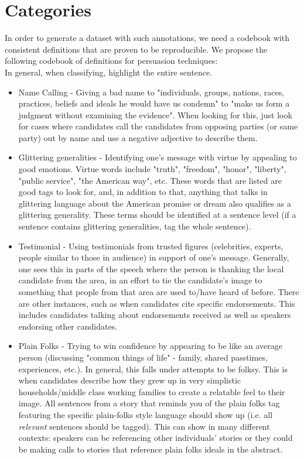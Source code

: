 \documentclass[letterpaper]{article}
\begin{document}
\section*{Categories}
In order to generate a dataset with such annotations, we need a codebook with consistent definitions that are proven to be reproducible. We propose the following codebook of definitions for persuasion techniques: \\
In general, when classifying, highlight the entire sentence.
\begin{itemize}
	\item Name Calling - Giving a bad name to "individuals, groups, nations, races, practices, beliefs and ideals he would have us condemn" to "make us form a judgment without examining the evidence". When looking for this, just look for cases where candidates call the candidates from opposing parties (or same party) out by name and use a negative adjective to describe them.  
	\item Glittering generalities - Identifying one's message with virtue by appealing to good emotions. Virtue words include "truth", "freedom", "honor", "liberty", "public service", "the American way", etc. These words that are listed are good tags to look for, and, in addition to that, anything that talks in glittering language about the American promise or dream also qualifies as a glittering generality. These terms should be identified at a sentence level (if a sentence contains glittering generalities, tag the whole sentence).
	\item Testimonial - Using testimonials from trusted figures (celebrities, experts, people similar to those in audience) in support of one's message. Generally, one sees this in parts of the speech where the person is thanking the local candidate from the area, in an effort to tie the candidate's image to something that people from that area are used to/have heard of before. There are other instances, such as when candidates cite specific endorsements. This includes candidates talking about endorsements received as well as speakers endorsing other candidates.
	\item Plain Folks - Trying to win confidence by appearing to be like an average person (discussing "common things of life" - family, shared passtimes, experiences, etc.). In general, this falls under attempts to be folksy. This is when candidates describe how they grew up in very simplistic households/middle class working families to create a relatable feel to their image. All sentences from a story that reminds you of the plain folks tag featuring the specific plain-folks style language should show up (i.e. all \emph{relevant} sentences should be tagged). This can show in many different contexts: speakers can be referencing other individuals' stories or they could be making calls to stories that reference plain folks ideals in the abstract.

\end{itemize}
\end{document}

